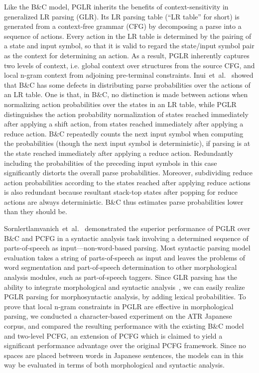 Like the B\&C model, PGLR inherits the benefits of context-sensitivity
in generalized LR parsing (GLR). Its LR parsing table (``LR table''
for short) is generated from a context-free grammar (CFG) by
decomposing a parse into a sequence of actions. Every action in the LR
table is determined by the pairing of a state and input symbol, so
that it is valid to regard the state/input symbol pair as the context
for determining an action. As a result, PGLR inherently captures two
levels of context, i.e. global context over structures from the source
CFG, and local n-gram context from adjoining pre-terminal constraints.
Inui~et~al.~\cite{Inui:97a} showed that B\&C has some defects in
distributing parse probabilities over the actions of an LR table. One
is that, in B\&C, no distinction is made between actions when
normalizing action probabilities over the states in an LR table, while
PGLR distinguishes the action probability normalization of states
reached immediately after applying a shift action, from states reached
immediately after applying a reduce action. B\&C repeatedly counts the
next input symbol when computing the probabilities (though the next
input symbol is deterministic), if parsing is at the state reached
immediately after applying a reduce action. Redundantly including the
probabilities of the preceding input symbols in this case
significantly distorts the overall parse probabilities. Moreover,
subdividing reduce action probabilities according to the states
reached after applying reduce actions is also redundant because
resultant stack-top states after popping for reduce actions are always
deterministic. B\&C thus estimates parse probabilities lower than they
should be.

Sornlertlamvanich~et~al.~\cite{Virach:97c} demonstrated the superior
performance of PGLR over B\&C and PCFG in a syntactic analysis task
involving a determined sequence of parts-of-speech as
input---non-word-based parsing. Most syntactic parsing model
evaluation takes a string of parts-of-speech as input and leaves the
problems of word segmentation and part-of-speech determination to
other morphological analysis modules, such as part-of-speech taggers.
Since GLR parsing has the ability to integrate morphological and
syntactic analysis~\cite{Tanaka:96}, we can easily realize PGLR
parsing for morphosyntactic analysis, by adding lexical probabilities.
To prove that local n-gram constraints in PGLR are effective in
morphological parsing, we conducted a character-based experiment on
the ATR Japanese corpus, and compared the resulting performance with
the existing B\&C model and two-level PCFG, an extension of PCFG which
is claimed to yield a significant performance advantage over the
original PCFG framework. Since no spaces are placed between words in
Japanese sentences, the models can in this way be evaluated in terms
of both morphological and syntactic analysis.

